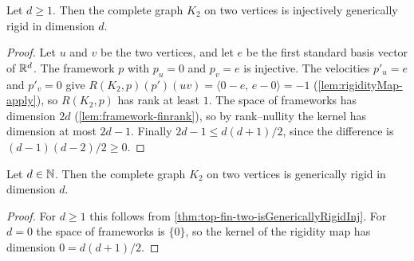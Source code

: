 \begin{theorem}
  \label{thm:top-fin-two-isGenericallyRigidInj}
  \leanok
  Let $d \ge 1$. Then the complete graph $K_2$ on two vertices is
  injectively generically rigid in dimension $d$.
\end{theorem}
\begin{proof}
  \leanok
  Let $u$ and $v$ be the two vertices, and let $e$ be the first
  standard basis vector of ${\mathbb{R}}^{d}$. The framework $p$ with $p_u = 0$
  and $p_v = e$ is injective. The velocities $p'_u = e$ and $p'_v = 0$
  give
  $R(K_2, p)(p')(uv) = \langle 0 - e,\, e - 0 \rangle = -1$
  (\cref{lem:rigidityMap-apply}), so $R(K_2, p)$ has rank at least
  $1$. The space of frameworks has dimension $2d$
  (\cref{lem:framework-finrank}), so by rank--nullity the kernel has
  dimension at most $2d - 1$. Finally $2d - 1 \le d(d+1)/2$, since the
  difference is $(d - 1)(d - 2)/2 \ge 0$.
\end{proof}

\begin{theorem}
  \label{thm:top-fin-two-isGenericallyRigid}
  \leanok
  Let $d \in {\mathbb{N}}$. Then the complete graph $K_2$ on two vertices is
  generically rigid in dimension $d$.
\end{theorem}
\begin{proof}
  \leanok
  For $d \ge 1$ this follows from
  \cref{thm:top-fin-two-isGenericallyRigidInj}. For $d = 0$ the space
  of frameworks is $\{0\}$, so the kernel of the rigidity map has
  dimension $0 = d(d+1)/2$.
\end{proof}
